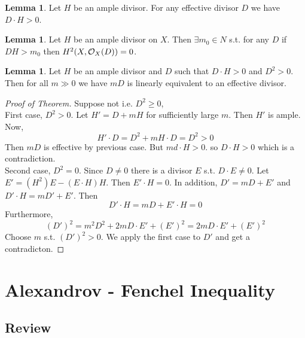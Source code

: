\documentclass[12pt]{extarticle}
\theoremstyle{definition}
\newtheorem{lemma}[theorem]{Lemma}
\begin{document}
\begin{lemma}
Let $H$ be an ample divisor. For any effective divisor $D$ we have $D \cdot H > 0$. 
\end{lemma}

\begin{lemma}
Let $H$ be an ample divisor on $X$. Then $\exists m_0 \in N$ s.t. for any $D$ if $D H > m_0$ then $H^2(X, \mathcal{O}_{X}(D)) = 0$. 
\end{lemma}

\begin{lemma}
Let $H$ be an ample divisor and $D$ such that $D \cdot H > 0$ and $D^2 > 0$. Then for all $m \gg 0$ we have $m D$ is linearly equivalent to an effective divisor.
\end{lemma}

\begin{proof}[Proof of Theorem]
Suppose not i.e. $D^2 \ge 0$,
\bigskip\\
First case, $D^2 > 0$. Let $H' = D + m H $ for sufficiently large $m$. Then $H'$ is ample. Now,
\[ H' \cdot D = D^2 + m H \cdot D = D^2 > 0 \]
Then $m D$ is effective by previous case. But $md \cdot H > 0$. so $D \cdot H > 0$ which is a contradiction.
\bigskip\\
Second case, $D^2 = 0$. Since $D \neq 0$ there is a divisor $E$ s.t. $D \cdot E \neq 0$. Let $E' = (H^2) E  - (E \cdot H) H$. Then $E' \cdot H = 0$. In addition, $D' = m D + E'$ and $D' \cdot H = m D' + E'$. Then
\[ D' \cdot H = m D +  E' \cdot H = 0 \]
Furthermore,
\[ (D')^2 = m^2 D^2 + 2 m D \cdot E' + (E')^2 = 2 m D \cdot E' + (E')^2 \]
Choose $m$ s.t. $(D')^2 > 0$. We apply the first case to $D'$ and get a contradicton. 
\end{proof}

\section{Alexandrov - Fenchel Inequality}


\subsection{Review}
\end{document}
